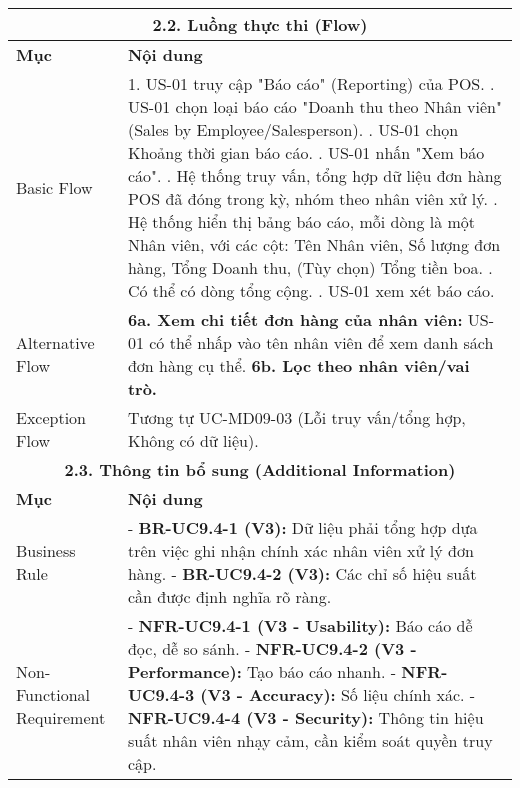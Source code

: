 \begin{longtable}{|m{4cm}|p{11cm}|}
\hline
\multicolumn{2}{|c|}{\textbf{2.2. Luồng thực thi (Flow)}} \\
\hline
\textbf{Mục} & \textbf{Nội dung} \\
\hline
Basic Flow & 1. US-01 truy cập "Báo cáo" (Reporting) của POS. \newline 2. US-01 chọn loại báo cáo "Doanh thu theo Nhân viên" (Sales by Employee/Salesperson). \newline 3. US-01 chọn Khoảng thời gian báo cáo. \newline 4. US-01 nhấn "Xem báo cáo". \newline 5. Hệ thống truy vấn, tổng hợp dữ liệu đơn hàng POS đã đóng trong kỳ, nhóm theo nhân viên xử lý. \newline 6. Hệ thống hiển thị bảng báo cáo, mỗi dòng là một Nhân viên, với các cột: Tên Nhân viên, Số lượng đơn hàng, Tổng Doanh thu, (Tùy chọn) Tổng tiền boa. \newline 7. Có thể có dòng tổng cộng. \newline 8. US-01 xem xét báo cáo. \\
\hline
Alternative Flow & \textbf{6a. Xem chi tiết đơn hàng của nhân viên:} US-01 có thể nhấp vào tên nhân viên để xem danh sách đơn hàng cụ thể. \newline \textbf{6b. Lọc theo nhân viên/vai trò.} \\
\hline
Exception Flow & Tương tự UC-MD09-03 (Lỗi truy vấn/tổng hợp, Không có dữ liệu). \\
\hline
\multicolumn{2}{|c|}{\textbf{2.3. Thông tin bổ sung (Additional Information)}} \\
\hline
\textbf{Mục} & \textbf{Nội dung} \\
\hline
Business Rule & - \textbf{BR-UC9.4-1 (V3):} Dữ liệu phải tổng hợp dựa trên việc ghi nhận chính xác nhân viên xử lý đơn hàng. \newline - \textbf{BR-UC9.4-2 (V3):} Các chỉ số hiệu suất cần được định nghĩa rõ ràng. \\
\hline
Non-Functional Requirement & - \textbf{NFR-UC9.4-1 (V3 - Usability):} Báo cáo dễ đọc, dễ so sánh. \newline - \textbf{NFR-UC9.4-2 (V3 - Performance):} Tạo báo cáo nhanh. \newline - \textbf{NFR-UC9.4-3 (V3 - Accuracy):} Số liệu chính xác. \newline - \textbf{NFR-UC9.4-4 (V3 - Security):} Thông tin hiệu suất nhân viên nhạy cảm, cần kiểm soát quyền truy cập. \\
\hline
\end{longtable}

